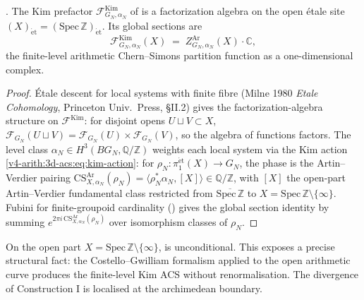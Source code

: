 \begin{theorem}
\label{v4-arith:w10-a:thm:CG-open}
\ClaimStatusProvedHere. The Kim prefactor
\(\mathcal F^{\mathrm{Kim}}_{G_{N},\alpha_{N}}\) of
 is a factorization
algebra on the open \'etale site
\((X)_{\mathrm{\acute et}}=(\mathrm{Spec}\,\mathbb{Z})_{\mathrm{\acute et}}\).
Its global sections are
\[
\mathcal F^{\mathrm{Kim}}_{G_{N},\alpha_{N}}(X)
\;=\;
Z^{\mathrm{Ar}}_{G_{N},\alpha_{N}}(X)
\cdot\mathbb C,
\]
the finite-level arithmetic Chern--Simons partition function as
a one-dimensional complex.
\end{theorem}

\begin{proof}
\'Etale descent for local systems with finite fibre (Milne 1980
\emph{Etale Cohomology}, Princeton Univ.~Press, \S II.2) gives the
factorization-algebra structure on \(\mathcal F^{\mathrm{Kim}}\):
for disjoint opens \(U\sqcup V\subset X\),
\(\mathcal F_{G_{N}}(U\sqcup V)=\mathcal F_{G_{N}}(U)\times\mathcal F_{G_{N}}(V)\),
so the algebra of functions factors. The level class \(\alpha_{N}\in H^{3}(BG_{N},\mathbb{Q}/\mathbb{Z})\)
weights each local system via the Kim action
\eqref{v4-arith:3d-acs:eq:kim-action}: for
\(\rho_{N}\colon\pi_{1}^{\mathrm{\acute{e}t}}(X)\to G_{N}\), the phase
is the Artin--Verdier pairing
\(\mathrm{CS}^{\mathrm{Ar}}_{X,\alpha_{N}}(\rho_{N})
=\langle\rho_{N}^{\ast}\alpha_{N},[X]\rangle\in\mathbb{Q}/\mathbb{Z}\),
with \([X]\) the open-part Artin--Verdier fundamental class restricted
from \(\overline{\mathrm{Spec}\,\mathbb{Z}}\) to
\(X=\mathrm{Spec}\,\mathbb{Z}\setminus\{\infty\}\). Fubini for
finite-groupoid cardinality
() gives the global
section identity by summing
\(e^{2\pi i\,\mathrm{CS}^{\mathrm{Ar}}_{X,\alpha_{N}}(\rho_{N})}\)
over isomorphism classes of \(\rho_{N}\).
\end{proof}

\begin{remark}
\label{v4-arith:w10-a:rem:construction-III-uncond}
On the open part \(X=\mathrm{Spec}\,\mathbb{Z}\setminus\{\infty\}\),
 is unconditional. This exposes a
precise structural fact: the Costello--Gwilliam formalism applied
to the open arithmetic curve produces the finite-level Kim ACS
without renormalisation. The divergence of Construction I is localised at
the archimedean boundary.
\end{remark}

